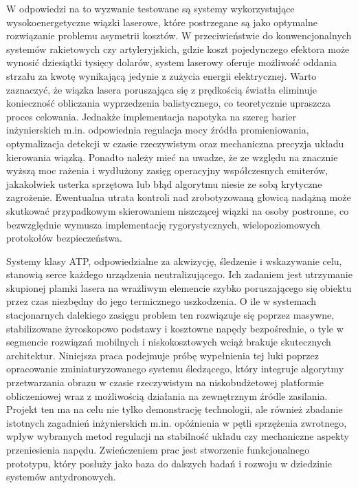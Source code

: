 \documentclass[a4paper,twoside,12pt]{book}
\begin{document}
W odpowiedzi na to wyzwanie testowane są systemy wykorzystujące wysokoenergetyczne wiązki laserowe, które postrzegane są jako optymalne rozwiązanie problemu asymetrii kosztów. W przeciwieństwie do konwencjonalnych systemów rakietowych czy artyleryjskich, gdzie koszt pojedynczego efektora może wynosić dziesiątki tysięcy dolarów, system laserowy oferuje możliwość oddania strzału za kwotę wynikającą jedynie z zużycia energii elektrycznej. Warto zaznaczyć, że wiązka lasera poruszająca się z prędkością światła eliminuje konieczność obliczania wyprzedzenia balistycznego, co teoretycznie upraszcza proces celowania. Jednakże implementacja napotyka na szereg barier inżynierskich m.in. odpowiednia regulacja mocy źródła promieniowania, optymalizacja detekcji w czasie rzeczywistym oraz mechaniczna precyzja układu kierowania wiązką. Ponadto należy mieć na uwadze, że ze względu na znacznie wyższą moc rażenia i wydłużony zasięg operacyjny współczesnych emiterów, jakakolwiek usterka sprzętowa lub błąd algorytmu niesie ze sobą krytyczne zagrożenie. Ewentualna utrata kontroli nad zrobotyzowaną głowicą nadążną może skutkować przypadkowym skierowaniem niszczącej wiązki na osoby postronne, co bezwzględnie wymusza implementację rygorystycznych, wielopoziomowych protokołów bezpieczeństwa.

Systemy klasy ATP, odpowiedzialne za akwizycję, śledzenie i wskazywanie celu, stanowią serce każdego urządzenia neutralizującego. Ich zadaniem jest utrzymanie skupionej plamki lasera na wrażliwym elemencie szybko poruszającego się obiektu przez czas niezbędny do jego termicznego uszkodzenia. O ile w systemach stacjonarnych dalekiego zasięgu problem ten rozwiązuje się poprzez masywne, stabilizowane żyroskopowo podstawy i kosztowne napędy bezpośrednie, o tyle w segmencie rozwiązań mobilnych i niskokosztowych wciąż brakuje skutecznych architektur. Niniejsza praca podejmuje próbę wypełnienia tej luki poprzez opracowanie zminiaturyzowanego systemu śledzącego, który integruje algorytmy przetwarzania obrazu w czasie rzeczywistym na niskobudżetowej platformie obliczeniowej wraz z możliwością działania na zewnętrznym źródle zasilania. Projekt ten ma na celu nie tylko demonstrację technologii, ale również zbadanie istotnych zagadnień inżynierskich m.in. opóźnienia w pętli sprzężenia zwrotnego, wpływ wybranych metod regulacji na stabilność układu czy mechaniczne aspekty przeniesienia napędu. Zwieńczeniem prac jest stworzenie funkcjonalnego prototypu, który posłuży jako baza do dalszych badań i rozwoju w dziedzinie systemów antydronowych.
\end{document}

